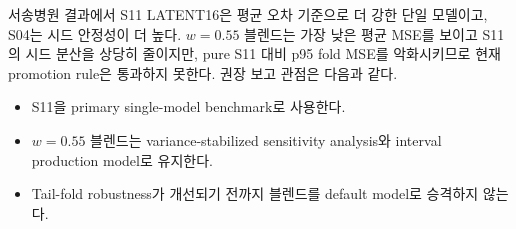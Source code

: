 \documentclass[11pt]{article}
\begin{document}
서송병원 결과에서 S11 LATENT16은 평균 오차 기준으로 더 강한 단일
모델이고, S04는 시드 안정성이 더 높다. $w=0.55$ 블렌드는 가장 낮은
평균 MSE를 보이고 S11의 시드 분산을 상당히 줄이지만, pure S11 대비
p95 fold MSE를 악화시키므로 현재 promotion rule은 통과하지 못한다.
권장 보고 관점은 다음과 같다.
\begin{itemize}
  \item S11을 primary single-model benchmark로 사용한다.
  \item $w=0.55$ 블렌드는 variance-stabilized sensitivity analysis와
  interval production model로 유지한다.
  \item Tail-fold robustness가 개선되기 전까지 블렌드를 default model로
  승격하지 않는다.
\end{itemize}
\end{document}
